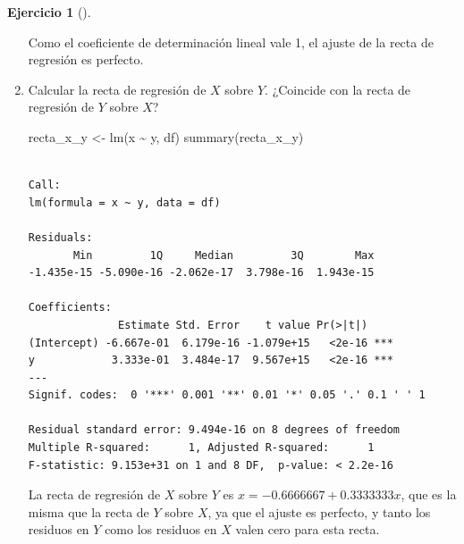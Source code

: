 \documentclass[
  a4paper,
]{scrreport}
\newenvironment{Shaded}{\begin{snugshade}}{\end{snugshade}}
\newcommand{\FunctionTok}[1]{\textcolor[rgb]{0.28,0.35,0.67}{#1}}
\newcommand{\NormalTok}[1]{\textcolor[rgb]{0.00,0.23,0.31}{#1}}
\newcommand{\OtherTok}[1]{\textcolor[rgb]{0.00,0.23,0.31}{#1}}
\newcommand{\SpecialCharTok}[1]{\textcolor[rgb]{0.37,0.37,0.37}{#1}}
\theoremstyle{definition}
\newtheorem{exercise}{Ejercicio}[chapter]
\theoremstyle{remark}
\begin{document}
\begin{exercise}[]
\begin{enumerate}
\begin{tcolorbox}
  Como el coeficiente de determinación lineal vale 1, el ajuste de la
  recta de regresión es perfecto.

  \end{tcolorbox}
\item
  Calcular la recta de regresión de \(X\) sobre \(Y\). ¿Coincide con la
  recta de regresión de \(Y\) sobre \(X\)?

  \begin{tcolorbox}[enhanced jigsaw, coltitle=black, left=2mm, colback=white, leftrule=.75mm, toptitle=1mm, breakable, bottomrule=.15mm, titlerule=0mm, bottomtitle=1mm, title=\textcolor{quarto-callout-tip-color}{\faLightbulb}\hspace{0.5em}{Solución}, arc=.35mm, toprule=.15mm, rightrule=.15mm, colframe=quarto-callout-tip-color-frame, opacityback=0, colbacktitle=quarto-callout-tip-color!10!white, opacitybacktitle=0.6]

\begin{Shaded}
\begin{Highlighting}[]
\NormalTok{recta\_x\_y }\OtherTok{\textless{}{-}} \FunctionTok{lm}\NormalTok{(x }\SpecialCharTok{\textasciitilde{}}\NormalTok{ y, df) }
\FunctionTok{summary}\NormalTok{(recta\_x\_y)}
\end{Highlighting}
\end{Shaded}

\begin{verbatim}

Call:
lm(formula = x ~ y, data = df)

Residuals:
       Min         1Q     Median         3Q        Max 
-1.435e-15 -5.090e-16 -2.062e-17  3.798e-16  1.943e-15 

Coefficients:
              Estimate Std. Error    t value Pr(>|t|)    
(Intercept) -6.667e-01  6.179e-16 -1.079e+15   <2e-16 ***
y            3.333e-01  3.484e-17  9.567e+15   <2e-16 ***
---
Signif. codes:  0 '***' 0.001 '**' 0.01 '*' 0.05 '.' 0.1 ' ' 1

Residual standard error: 9.494e-16 on 8 degrees of freedom
Multiple R-squared:      1, Adjusted R-squared:      1 
F-statistic: 9.153e+31 on 1 and 8 DF,  p-value: < 2.2e-16
\end{verbatim}

  La recta de regresión de \(X\) sobre \(Y\) es
  \(x = -0.6666667 + 0.3333333 x\), que es la misma que la recta de
  \(Y\) sobre \(X\), ya que el ajuste es perfecto, y tanto los residuos
  en \(Y\) como los residuos en \(X\) valen cero para esta recta.

  \end{tcolorbox}
\end{enumerate}

\end{exercise}
\end{document}
